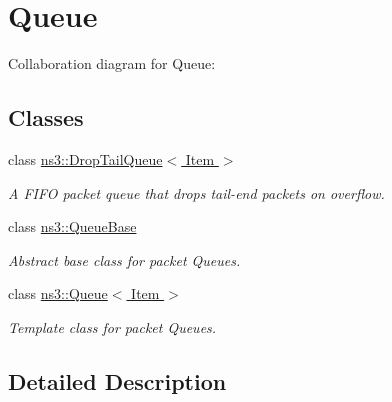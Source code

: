 \hypertarget{group__queue}{}\section{Queue}
\label{group__queue}
Collaboration diagram for Queue\+:
\subsection*{Classes}
\begin{DoxyCompactItemize}
\item 
class \hyperlink{classns3_1_1DropTailQueue}{ns3\+::\+Drop\+Tail\+Queue$<$ Item $>$}
\begin{DoxyCompactList}\small\item\em A F\+I\+FO packet queue that drops tail-\/end packets on overflow. \end{DoxyCompactList}\item 
class \hyperlink{classns3_1_1QueueBase}{ns3\+::\+Queue\+Base}
\begin{DoxyCompactList}\small\item\em Abstract base class for packet Queues. \end{DoxyCompactList}\item 
class \hyperlink{classns3_1_1Queue}{ns3\+::\+Queue$<$ Item $>$}
\begin{DoxyCompactList}\small\item\em Template class for packet Queues. \end{DoxyCompactList}\end{DoxyCompactItemize}


\subsection{Detailed Description}
